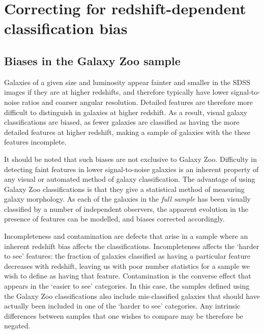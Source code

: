 \documentclass[useAMS,usenatbib]{mn2e}
\begin{document}
\section{Correcting for redshift-dependent classification bias}
\label{sec:redshift_bias}
\subsection{Biases in the Galaxy Zoo sample}
\label{sec:biases}

Galaxies of a given size and luminosity appear fainter and smaller in the SDSS images if they are at higher redshifts, and therefore typically have lower signal-to-noise ratios and coarser angular resolution. Detailed features are therefore more difficult to distinguish in galaxies at higher redshift. As a result, visual galaxy classifications are biased, as fewer galaxies are classified as having the more detailed features at higher redshift, making a sample of galaxies with the these features incomplete.

It should be noted that such biases are not exclusive to Galaxy Zoo. Difficulty in detecting faint features in lower signal-to-noise galaxies is an inherent property of any visual or automated method of galaxy classification. The advantage of using Galaxy Zoo classifications is that they give a statistical method of measuring galaxy morphology. As each of the galaxies in the \textit{full sample} has been visually classified by a number of independent observers, the apparent evolution in the presence of features can be modelled, and biases corrected accordingly.

Incompleteness and contamination are defects that arise in a sample where an inherent redshift bias affects the classifications. Incompleteness affects the `harder to see' features: the fraction of galaxies classified as having a particular feature decreases with redshift, leaving us with poor number statistics for a sample we wish to define as having that feature.  Contamination is the converse effect that appears in the `easier to see' categories.  In this case, the samples defined using the Galaxy Zoo classifications also include mis-classified galaxies that should have actually been included in one of the `harder to see' categories. Any intrinsic differences between samples that one wishes to compare may be therefore be negated.

\end{document}
